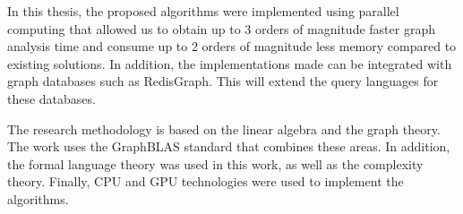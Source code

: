 In this thesis, the proposed algorithms were implemented using parallel computing that allowed us to obtain up to 3 orders of magnitude faster graph analysis time and consume up to 2 orders of magnitude less memory compared to existing solutions. In addition, the implementations made can be integrated with graph databases such as RedisGraph. This will extend the query languages for these databases.

{\methods} The research methodology is based on the linear algebra and the graph theory. The work uses the GraphBLAS standard that combines these areas. In addition, the formal language theory was used in this work, as well as the complexity theory. Finally, CPU and GPU technologies were used to implement the algorithms.%

